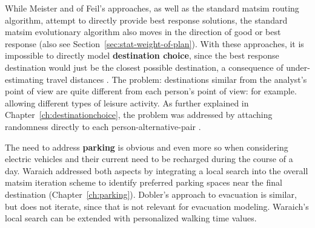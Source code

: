While Meister and of Feil's approaches, as well as the standard \gls{matsim} routing algorithm, attempt to directly provide best response solutions, the standard \gls{matsim} evolutionary algorithm also moves in the direction of good or best response (also see Section~\ref{sec:stat-weight-of-plan}).  With these approaches, it is impossible to directly model \textbf{destination choice}, since the best response destination would just be the closest possible destination, a consequence of under-estimating travel distances \citep{HorniEtAl_TRR_2009}.  The problem: destinations similar from the analyst's point of view are quite different from each person's point of view: for example. allowing different types of leisure activity.  As further explained in Chapter~\ref{ch:destinationchoice}, the problem was addressed by attaching randomness directly to each person-alternative-pair
\citep[also see][]{HorniEtAl2011TrbLocationChoice}.



%

The need to address \textbf{parking} is obvious and even more so when considering electric vehicles and their current need to be recharged during the course of a day. 
Waraich addressed both aspects by 
integrating a local search into the overall \gls{matsim} iteration scheme to identify preferred parking spaces near the final destination (Chapter~\ref{ch:parking}). 
Dobler's approach \citep[][]{Dobler_PhDThesis_2013} to evacuation is similar, but 
does not iterate, since that is not relevant for evacuation modeling.
Waraich's local search can be extended with personalized walking time values.


